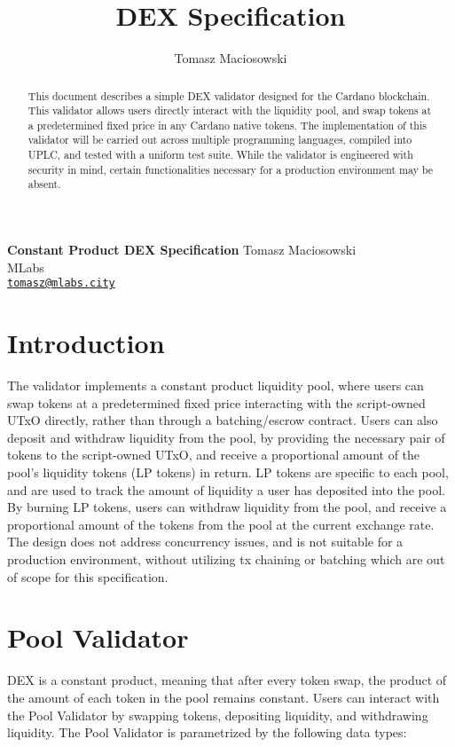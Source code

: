 \documentclass{article}
\title{DEX Specification}
\author{Tomasz Maciosowski}
\date{}
\begin{document}
\begin{center}
  \vskip 10mm {\LARGE\bf
      Constant Product DEX Specification
    }
  \vskip 10mm
  Tomasz Maciosowski \\
  MLabs\\
  \href{mailto:tomasz@mlabs.city}{\tt tomasz@mlabs.city} \\
\end{center}

\vskip 5mm

\begin{abstract}
  This document describes a simple DEX validator designed for the Cardano blockchain.
  This validator allows users directly interact with the liquidity pool, and swap tokens at a predetermined fixed price in any Cardano native tokens.
  The implementation of this validator will be carried out across multiple programming languages, compiled into UPLC, and tested with a uniform test suite.
  While the validator is engineered with security in mind, certain functionalities necessary for a production environment may be absent.
\end{abstract}

\section{Introduction}

The validator implements a constant product liquidity pool, where users can swap tokens at a predetermined fixed price interacting with the script-owned UTxO directly, rather than through a batching/escrow contract.
Users can also deposit and withdraw liquidity from the pool, by providing the necessary pair of tokens to the script-owned UTxO, and receive a proportional amount of the pool's liquidity tokens (LP tokens) in return.
LP tokens are specific to each pool, and are used to track the amount of liquidity a user has deposited into the pool.
By burning LP tokens, users can withdraw liquidity from the pool, and receive a proportional amount of the tokens from the pool at the current exchange rate.
The design does not address concurrency issues, and is not suitable for a production environment, without utilizing tx chaining or batching which are out of scope for this specification.

\section{Pool Validator}

DEX is a constant product, meaning that after every token swap, the product of the amount of each token in the pool remains constant.
Users can interact with the Pool Validator by swapping tokens, depositing liquidity, and withdrawing liquidity.
The Pool Validator is parametrized by the following data types:
\end{document}
